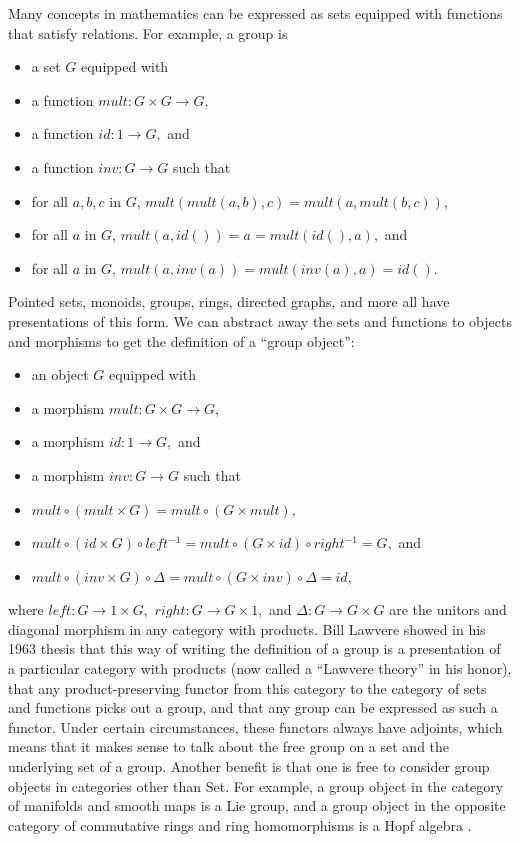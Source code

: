 \documentclass[12pt,twoside,openright]{report}
\newcommand{\maps}{\colon}
\begin{document}
Many concepts in mathematics can be expressed as sets equipped with functions that satisfy relations.  For example, a group is
\begin{itemize}
  \item a set $G$ equipped with
  \item a function $mult\maps G \times G \to G,$
  \item a function $id\maps 1 \to G,$ and
  \item a function $inv\maps G \to G$ such that
  \item for all $a, b, c$ in $G$, $mult(mult(a, b), c) = mult(a, mult(b, c)),$
  \item for all $a$ in $G$, $mult(a, id()) = a = mult(id(), a),$ and
  \item for all $a$ in $G$, $mult(a, inv(a)) = mult(inv(a), a) = id().$
\end{itemize}
Pointed sets, monoids, groups, rings, directed graphs, and more all have presentations of this form.  We can abstract away the sets and functions to objects and morphisms to get the definition of a ``group object'':
\begin{itemize}
  \item an object $G$ equipped with
  \item a morphism $mult\maps G \times G \to G,$
  \item a morphism $id\maps 1 \to G,$ and
  \item a morphism $inv\maps G \to G$ such that
  \item $mult \circ (mult \times G) = mult \circ (G \times mult),$
  \item $mult \circ (id \times G) \circ left^{-1} = mult \circ (G \times id) \circ right^{-1} = G,$ and
  \item $mult \circ (inv \times G) \circ \Delta = mult \circ (G \times inv) \circ \Delta = id,$
\end{itemize}
where $left\maps G \to 1 \times G,$ $right\maps G \to G \times 1,$ and $\Delta\maps G \to G \times G$ are the unitors and diagonal morphism in any category with products.  Bill Lawvere showed in his 1963 thesis \cite{Lawvere} that this way of writing the definition of a group is a presentation of a particular category with products (now called a ``Lawvere theory'' in his honor), that any product-preserving functor from this category to the category of sets and functions picks out a group, and that any group can be expressed as such a functor.  Under certain circumstances, these functors always have adjoints, which means that it makes sense to talk about the free group on a set and the underlying set of a group.  Another benefit is that one is free to consider group objects in categories other than Set.  For example, a group object in the category of manifolds and smooth maps is a Lie group, and a group object in the opposite category of commutative rings and ring homomorphisms is a Hopf algebra \cite{nlabgroupobject}.
\end{document}
